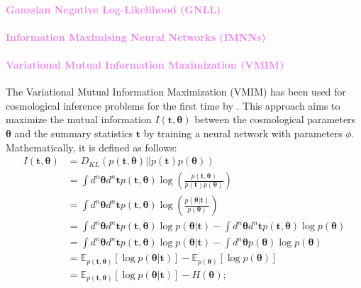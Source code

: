 \documentclass{aa}
\begin{document}
\paragraph{\textcolor{violet}{Gaussian Negative Log-Likelihood (GNLL)}}
\paragraph{\textcolor{violet}{Information Maximising Neural Networks (IMNNs)}}
\paragraph{\textcolor{violet}{Variational Mutual Information Maximization (VMIM)}}
The Variational Mutual Information Maximization (VMIM) has been used for cosmological inference problems for the first time by \citet{jeffrey2021likelihood}. This approach aims to maximize the mutual information $I(\bm{t}, \bm {\theta})$ between the cosmological parameters $\bm{\theta}$ and the summary statistics $\bm t$ by training a neural network with parameters $\phi$. 
Mathematically, it is defined as follows:
\begin{align}\label{Eq:mutual_information}
    I(\bm{t}, \bm {\theta}) &= D_{KL}(p(\bm {t}, \bm {\theta})||p(\bm {t})p(\bm {\theta})) \\ \nonumber
    &= \int d^n \bm{\theta} d^n \bm{t} p(\bm t, \bm \theta)\log{\left( \frac{ p(\bm {t}, \bm {\theta})}{ p(\bm {t}) p(\bm {\theta})} \right)} \\ \nonumber
    &= \int d^n \bm{\theta} d^n \bm{t} p(\bm t, \bm {\theta})\log{\left( \frac{ p(\bm {\theta} | \bm {t} )}{ p(\bm {\theta})} \right)} \\ \nonumber
        &= \int d^n \bm{\theta} d^n \bm{t} p(\bm t, \bm {\theta})\log{p(\bm {\theta} | \bm {t} )} - \int d^n \bm{\theta}  d^n \bm{t} p(\bm t, \bm {\theta})\log{p(\bm {\theta})} \\ \nonumber
    &= \int d^n \bm{\theta} d^n \bm{t} p(\bm t, \bm {\theta})\log{p(\bm {\theta} | \bm {t} )} - \int d^n \bm{\theta} p(\bm {\theta})\log{p(\bm {\theta})} \\ \nonumber
    &= \mathbb{E}_{p(\bm {t}, \bm {\theta})} [\log{p(\bm {\theta} | \bm {t} )}]- \mathbb{E}_{p(\bm {\theta})} [\log{p(\bm {\theta})}] \\ \nonumber
    &= \mathbb{E}_{p(\bm {t}, \bm {\theta})} [\log{p(\bm {\theta} | \bm {t} )}]- H(\bm {\theta});
\end{align}
\end{document}
